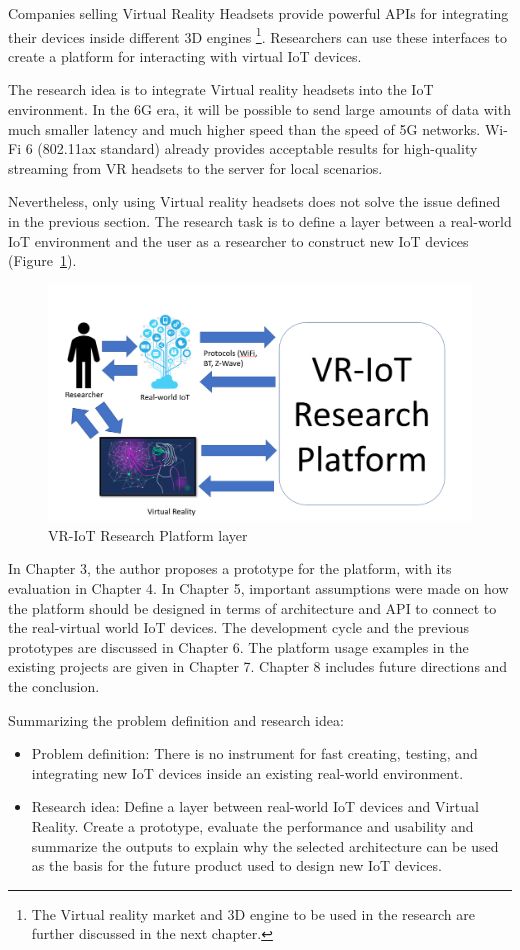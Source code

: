 Companies selling Virtual Reality Headsets provide powerful APIs for integrating their devices inside different 3D engines \footnote{The Virtual reality market and 3D engine to be used in the research are further discussed in the next chapter.}. Researchers can use these interfaces to create a platform for interacting with virtual IoT devices.

The research idea is to integrate Virtual reality headsets into the IoT environment. In the 6G era, it will be possible to send large amounts of data with much smaller latency and much higher speed than the speed of 5G networks. Wi-Fi 6 (802.11ax standard) already provides acceptable results for high-quality streaming from VR headsets to the server for local scenarios.

Nevertheless, only using Virtual reality headsets does not solve the issue defined in the previous section. The research task is to define a layer between a real-world IoT environment and the user as a researcher to construct new IoT devices (Figure~\ref{fig:VR-IoTResearchPlatformLayer-figure}). 

\begin{figure}
  \centering
  \includegraphics[width=0.9\linewidth]{figures/VR-IoTResearchPlatformLayer.png}
  \caption{VR-IoT Research Platform layer}
  \label{fig:VR-IoTResearchPlatformLayer-figure}
\end{figure}

In Chapter 3, the author proposes a prototype for the platform, with its evaluation in Chapter 4. In Chapter 5, important assumptions were made on how the platform should be designed in terms of architecture and API to connect to the real-virtual world IoT devices. The development cycle and the previous prototypes are discussed in Chapter 6. The platform usage examples in the existing projects are given in Chapter 7. Chapter 8 includes future directions and the conclusion.

Summarizing the problem definition and research idea:

\begin{itemize}
    \item Problem definition: There is no instrument for fast creating, testing, and integrating new IoT devices inside an existing real-world environment.  
    \item Research idea: Define a layer between real-world IoT devices and Virtual Reality. Create a prototype, evaluate the performance and usability and summarize the outputs to explain why the selected architecture can be used as the basis for the future product used to design new IoT devices.
\end{itemize}